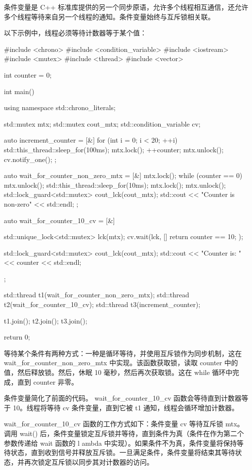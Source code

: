 条件变量是 C++ 标准库提供的另一个同步原语，允许多个线程相互通信，还允许多个线程等待来自另一个线程的通知。条件变量始终与互斥锁相关联。

以下示例中，线程必须等待计数器等于某个值：

\begin{cpp}
#include <chrono>
#include <condition_variable>
#include <iostream>
#include <mutex>
#include <thread>
#include <vector>

int counter = 0;

int main() {
    using namespace std::chrono_literals;

    std::mutex mtx;
    std::mutex cout_mtx;
    std::condition_variable cv;

    auto increment_counter = [&] {
        for (int i = 0; i < 20; ++i) {
            std::this_thread::sleep_for(100ms);
            mtx.lock();
            ++counter;
            mtx.unlock();
            cv.notify_one();
        }
    };

    auto wait_for_counter_non_zero_mtx = [&] {
        mtx.lock();
        while (counter == 0) {
            mtx.unlock();
            std::this_thread::sleep_for(10ms);
            mtx.lock();
        }
        mtx.unlock();
        std::lock_guard<std::mutex> cout_lck(cout_mtx);
        std::cout << "Counter is non-zero" << std::endl;
    };

    auto wait_for_counter_10_cv = [&] {
        std::unique_lock<std::mutex> lck(mtx);
        cv.wait(lck, [] { return counter == 10; });

        std::lock_guard<std::mutex> cout_lck(cout_mtx);
        std::cout << "Counter is: " << counter << std::endl;
    };

    std::thread t1(wait_for_counter_non_zero_mtx);
    std::thread t2(wait_for_counter_10_cv);
    std::thread t3(increment_counter);

    t1.join();
    t2.join();
    t3.join();

    return 0;
}
\end{cpp}

等待某个条件有两种方式：一种是循环等待，并使用互斥锁作为同步机制，这在 wait\_for\_counter\_non\_zero\_mtx 中实现。该函数获取锁，读取 counter 中的值，然后释放锁。然后，休眠 10 毫秒，然后再次获取锁。这在 while 循环中完成，直到 counter 非零。

条件变量简化了前面的代码。 wait\_for\_counter\_10\_cv 函数会等待直到计数器等于 10。线程将等待 cv 条件变量，直到它被 t1 通知，线程会循环增加计数器。

wait\_for\_counter\_10\_cv 函数的工作方式如下：条件变量 cv 等待互斥锁 mtx。调用 wait() 后，条件变量锁定互斥锁并等待，直到条件为真（条件在作为第二个参数传递给 wait 函数的 l ambda 中实现）。如果条件不为真，条件变量将保持等待状态，直到收到信号并释放互斥锁。一旦满足条件，条件变量将结束其等待状态，并再次锁定互斥锁以同步其对计数器的访问。

